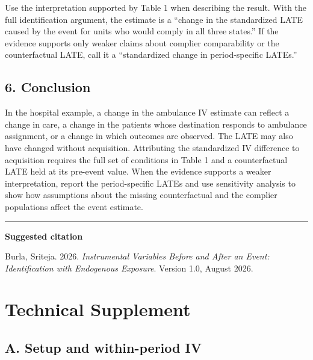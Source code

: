 \documentclass[
  11pt,
]{article}
\begin{document}
Use the interpretation supported by Table 1 when describing the result.
With the full identification argument, the estimate is a ``change in the
standardized LATE caused by the event for units who would comply in all
three states.'' If the evidence supports only weaker claims about
complier comparability or the counterfactual LATE, call it a
``standardized change in period-specific LATEs.''

\hypertarget{conclusion}{%
\subsection{6. Conclusion}\label{conclusion}}

In the hospital example, a change in the ambulance IV estimate can
reflect a change in care, a change in the patients whose destination
responds to ambulance assignment, or a change in which outcomes are
observed. The LATE may also have changed without acquisition.
Attributing the standardized IV difference to acquisition requires the
full set of conditions in Table 1 and a counterfactual LATE held at its
pre-event value. When the evidence supports a weaker interpretation,
report the period-specific LATEs and use sensitivity analysis to show
how assumptions about the missing counterfactual and the complier
populations affect the event estimate.

\vspace{2.2em}

\noindent

\rule{0.34\linewidth}{0.4pt}

\vspace{1.0em}

\textbf{Suggested citation}

Burla, Sriteja. 2026. \emph{Instrumental Variables Before and After an
Event: Identification with Endogenous Exposure}. Version 1.0, August
2026.

\newpage

\hypertarget{technical-supplement}{%
\section{Technical Supplement}\label{technical-supplement}}

\hypertarget{a.-setup-and-within-period-iv}{%
\subsection{A. Setup and within-period
IV}\label{a.-setup-and-within-period-iv}}
\end{document}
